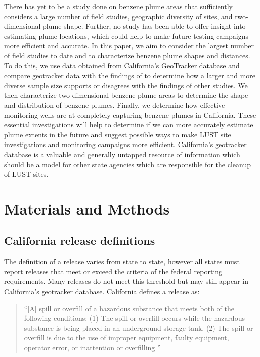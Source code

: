 \documentclass[draft,linenumbers]{agujournal2018}
\begin{document}
There has yet to be a study done on benzene plume areas that
sufficiently considers a large number of field studies, geographic
diversity of sites, and two-dimensional plume shape. Further, no study
has been able to offer insight into estimating plume locations, which
could help to make future testing campaigns more efficient and accurate.
In this paper, we aim to consider the largest number of field studies to
date and to characterize benzene plume shapes and distances. To do this,
we use data obtained from California's GeoTracker database and compare
geotracker data with the findings of \citet{connor2015} to determine how
a larger and more diverse sample size supports or disagrees with the
findings of other studies. We then characterize two-dimensional benzene
plume areas to determine the shape and distribution of benzene plumes.
Finally, we determine how effective monitoring wells are at completely
capturing benzene plumes in California. These essential investigations
will help to determine if we can more accurately estimate plume extents
in the future and suggest possible ways to make LUST site investigations
and monitoring campaigns more efficient. California's geotracker
database is a valuable and generally untapped resource of information
which should be a model for other state agencies which are responsible
for the cleanup of LUST sites.

\section{Materials and Methods}

\subsection{California release definitions}

The definition of a release varies from state to state, however all
states must report releases that meet or exceed the criteria of the
federal reporting requirements. Many releases do not meet this threshold
but may still appear in California's geotracker database. California
defines a release as:

\begin{quote}
``{[}A{]} spill or overfill of a hazardous substance that meets both of
the following conditions: (1) The spill or overfill occurs while the
hazardous substance is being placed in an underground storage tank. (2)
The spill or overfill is due to the use of improper equipment, faulty
equipment, operator error, or inattention or overfilling
\citep{careport25295.5}''
\end{quote}
\end{document}

